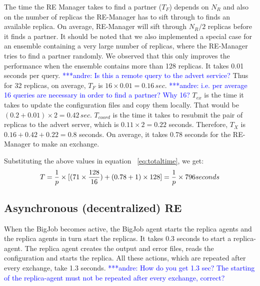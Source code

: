 \documentclass{rspublic}
\newcommand{\alnote}[1]{ {\textcolor{blue} { ***andre: #1 }}}
\newcommand{\alnote}[1]{}
\begin{document}
The time the RE Manager takes to find a partner ($T_F$) depends on
$N_R$ and also on the number of replicas the RE-Manager has to sift
through to finds an available replica. On average, RE-Manager will
sift through $N_R/2$ replicas before it finds a partner. %
It should be noted that we also implemented a
special case for an ensemble containing a very large number of
replicas, where the RE-Manager tries to find a partner randomly. We
observed that this only improves the performance when the ensemble
contains more than 128 replicas. It takes 0.01 seconds per
query. \alnote{Is this a remote query to the advert service?}  Thus
for 32 replicas, on average, $T_F$ is $16\times
0.01=0.16\,sec$. \alnote{i.e. per average 16 queries are necessary in
  order to find a partner? Why 16?}  $T_{ex}$ is the time it takes to
update the configuration files and copy them locally. That would be
$({0.2+0.01})\times 2=0.42\,sec$. $T_{coord}$ is the time it takes to
resubmit the pair of replicas to the advert server, which is
$0.11\times 2 = 0.22$ seconds. Therefore, $T_{X}$ is
$0.16+0.42+0.22=0.8$ seconds. On average, it takes 0.78
seconds for the RE-Manager to make an exchange.



Substituting the above values in equation ~\ref{eq:totaltime}, we get:
\begin{eqnarray}
T=  {1 \over p} \times {[ {(71\times {128\over 16}}) + (0.78 + 1)\times 128]} = {1 \over p} \times 796 seconds
\label{eq:cent}
\end{eqnarray}


\subsection{Asynchronous (decentralized) RE}

When the BigJob becomes active, the BigJob agent starts the replica
agents and the replica agents in turn start the replicas. It takes 0.3
seconds to start a replica-agent.  The replica agent creates the
output and error files, reads the configuration and starts the
replica. All these actions, which are repeated after every exchange,
take 1.3 seconds. \alnote{How do you get 1.3 sec? The starting of the replica-agent
must not be repeated after every exchange, correct?}
\end{document}
